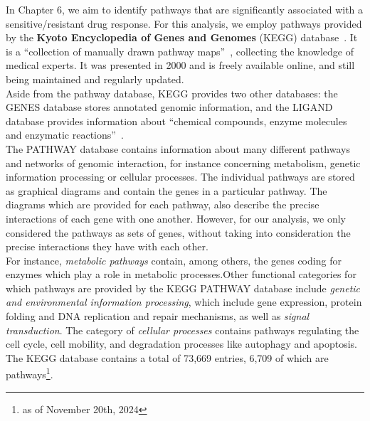 In Chapter 6, we aim to identify pathways that are significantly associated with a sensitive/resistant drug response. For this analysis, we employ pathways provided by the \textbf{Kyoto Encyclopedia of Genes and Genomes} (KEGG) database~\cite{kegg_original_paper}. It is a ``collection of manually drawn pathway maps''~\cite{kegg_website}, collecting the knowledge of medical experts. It was presented in 2000 and is freely available online, and still being maintained and regularly updated.\\
Aside from the pathway database, KEGG provides two other databases: the GENES database stores annotated genomic information, and the LIGAND database provides information about ``chemical compounds, enzyme molecules and enzymatic reactions''~\cite{kegg_original_paper}.\\
The PATHWAY database contains information about many different pathways and networks of genomic interaction, for instance concerning metabolism, genetic information processing or cellular processes. The individual pathways are stored as graphical diagrams and contain the genes in a particular pathway. The diagrams which are provided for each pathway, also describe the precise interactions of each gene with one another. However, for our analysis, we only considered the pathways as sets of genes, without taking into consideration the precise interactions they have with each other.\\
For instance, \textit{metabolic pathways} contain, among others, the genes coding for enzymes which play a role in metabolic processes.Other functional categories for which pathways are provided by the KEGG PATHWAY database include \textit{genetic and environmental information processing}, which include gene expression, protein folding and DNA replication and repair mechanisms, as well as \textit{signal transduction}. The category of \textit{cellular processes} contains pathways regulating the cell cycle, cell mobility, and degradation processes like autophagy and apoptosis.\\
The KEGG database contains a total of 73,669 entries, 6,709 of which are pathways\footnote{as of November 20th, 2024}.

